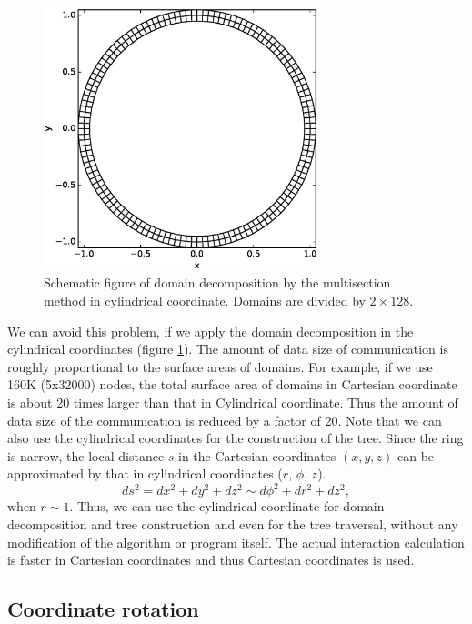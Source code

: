 \documentclass[Afour,sageh,times]{sagej}
\newcommand{\rev}[1]{{#1}}
\begin{document}
\begin{figure}
  \centering
    \includegraphics[width=8cm,clip]{./fig/domain_cyl.eps}
  \caption{Schematic figure of domain decomposition by the multisection
    method in cylindrical coordinate. Domains are divided by $2 \times 128$.}
  \label{fig:domain_cyl}
\end{figure}

We can avoid this problem, if we apply the domain decomposition in the
cylindrical coordinates (figure \ref{fig:domain_cyl}). \rev{The amount
  of data size of communication is roughly proportional to the surface
  areas of domains. For example, if we use 160K (5x32000) nodes, the
  total surface area of domains in Cartesian coordinate is about 20
  times larger than that in Cylindrical coordinate. Thus the amount of
  data size of the communication is reduced by a factor of 20.}  Note
that we can also use the cylindrical coordinates for the construction
of the tree.  Since the ring is narrow, the local distance $s$ in the
Cartesian coordinates $(x, y, z)$ can be approximated by that in
cylindrical coordinates ($r$, $\phi$, $z$).
\begin{equation}
  \label{eq:metric}
  ds^2 = dx^2 + dy^2 + dz^2 \sim d\phi ^2 + dr^2 + dz^2,
\end{equation}
when $r \sim 1$. Thus, we can use the cylindrical coordinate for
domain decomposition and tree construction and even for the tree
traversal, without any modification of the algorithm or program
itself. The actual interaction calculation is faster in Cartesian
coordinates and thus Cartesian coordinates is used.


\subsection{Coordinate rotation}
\label{subsec:exptcl}
\end{document}
